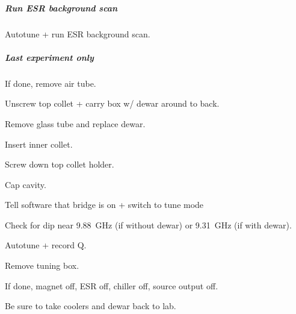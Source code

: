 \subparagraph{Run ESR background scan}
Autotune + run ESR background scan.

\subparagraph{Last experiment only}
If done, remove air tube.

Unscrew top collet + carry box w/ dewar around to back.

Remove glass tube and replace dewar.

Insert inner collet.

Screw down top collet holder.

Cap cavity.

Tell software that bridge is on + switch to tune mode

Check for dip near 9.88~GHz (if without dewar) or 9.31~GHz (if with dewar).

Autotune + record Q.

Remove tuning box.

If done, magnet off, ESR off, chiller off, source output off.

Be sure to take coolers and dewar back to lab.

\timeblockend
